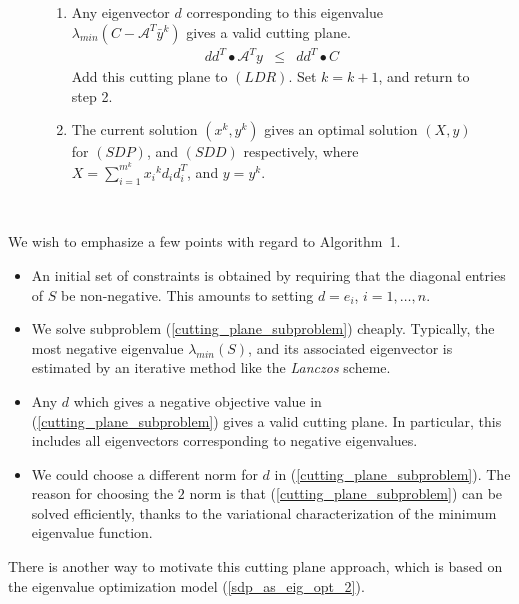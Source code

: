 \documentclass[12pt]{kluwer}
\begin{document}
\begin{article}
\begin{figure}
{\begin{minipage}{\textwidth}
\begin{enumerate}
Update the lower bound: $\mbox{LB} = \max \{\mbox{LB},b^T(\bar{y}^k + \lambda \hat{y})\}$, where
$\lambda = |\lambda_{min}(C-\mathcal{A}^T\bar{y}^k)|$, and $\hat{y}$ satisfies Theorem
\ref{constant_trace_corollary}. If $|\mbox{LB} - \mbox{UB}| \le \epsilon_1$, or
$\lambda \le \epsilon_2$, go to step 5.
\item Any eigenvector $d$ corresponding to this eigenvalue $\lambda_{min}(C-\mathcal{A}^T\bar{y}^k)$ gives
a valid cutting plane. 
\begin{displaymath}
\begin{array}{ccc}
dd^T \bullet \mathcal{A}^Ty & \le & dd^T \bullet C
\end{array}
\end{displaymath}
Add this cutting plane to $(LDR)$. Set $k = k+1$, and return to step 2.
\item The current solution $(x^k,y^k)$ gives an optimal solution $(X,y)$ for $(SDP)$, and
$(SDD)$ respectively, where $X = \sum_{i=1}^{m^k}{x_i}^kd_id_i^T$, and $y=y^k$.
\end{enumerate}
\end{minipage}
}  \\
\end{figure}


We wish to emphasize a few points with regard to Algorithm~1.
\begin{itemize}
\item An initial set of constraints is obtained by requiring that the diagonal entries
of $S$ be non-negative. This amounts to setting $d=e_i$, $i=1,\ldots,n$.
\item We solve subproblem (\ref{cutting_plane_subproblem}) cheaply. Typically,
the most negative eigenvalue $\lambda_{min}(S)$, and its associated eigenvector is estimated
by an iterative method like the {\em Lanczos} scheme.
\item Any $d$ which gives a negative objective value in (\ref{cutting_plane_subproblem})
gives a valid cutting plane. In particular, this includes all eigenvectors corresponding
to negative eigenvalues.
\item We could choose a different norm for $d$ in (\ref{cutting_plane_subproblem}). The
reason for choosing the $2$ norm is that (\ref{cutting_plane_subproblem}) can be
solved efficiently, thanks to the variational characterization of the minimum eigenvalue
function. 
\end{itemize}
There is another way to motivate this cutting plane approach, which is based on the
eigenvalue optimization model (\ref{sdp_as_eig_opt_2}).


\end{article}
\end{document}
